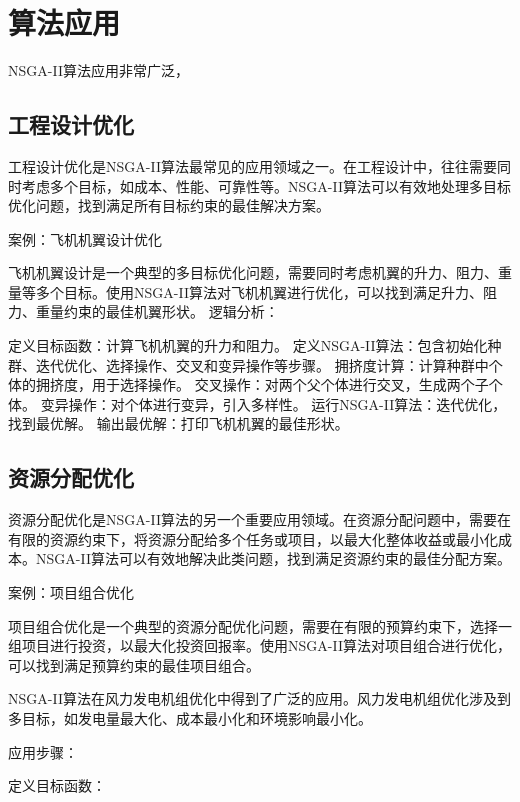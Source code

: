 \documentclass[lang=cn,a4paper,citestyle=gb7714-2015, bibstyle=gb7714-2015]{elegantpaper}
\begin{document}
    \section{算法应用}
    NSGA-II算法应用非常广泛，

    \subsection{工程设计优化}

    工程设计优化是NSGA-II算法最常见的应用领域之一。在工程设计中，往往需要同时考虑多个目标，如成本、性能、可靠性等。NSGA-II算法可以有效地处理多目标优化问题，找到满足所有目标约束的最佳解决方案。

    案例：飞机机翼设计优化

    飞机机翼设计是一个典型的多目标优化问题，需要同时考虑机翼的升力、阻力、重量等多个目标。使用NSGA-II算法对飞机机翼进行优化，可以找到满足升力、阻力、重量约束的最佳机翼形状。
    逻辑分析：

    定义目标函数：计算飞机机翼的升力和阻力。
    定义NSGA-II算法：包含初始化种群、迭代优化、选择操作、交叉和变异操作等步骤。
    拥挤度计算：计算种群中个体的拥挤度，用于选择操作。
    交叉操作：对两个父个体进行交叉，生成两个子个体。
    变异操作：对个体进行变异，引入多样性。
    运行NSGA-II算法：迭代优化，找到最优解。
    输出最优解：打印飞机机翼的最佳形状。

    \subsection{资源分配优化}

    资源分配优化是NSGA-II算法的另一个重要应用领域。在资源分配问题中，需要在有限的资源约束下，将资源分配给多个任务或项目，以最大化整体收益或最小化成本。NSGA-II算法可以有效地解决此类问题，找到满足资源约束的最佳分配方案。

    案例：项目组合优化

    项目组合优化是一个典型的资源分配优化问题，需要在有限的预算约束下，选择一组项目进行投资，以最大化投资回报率。使用NSGA-II算法对项目组合进行优化，可以找到满足预算约束的最佳项目组合。

    NSGA-II算法在风力发电机组优化中得到了广泛的应用。风力发电机组优化涉及到多目标，如发电量最大化、成本最小化和环境影响最小化。

    应用步骤：

    定义目标函数：
\end{document}

